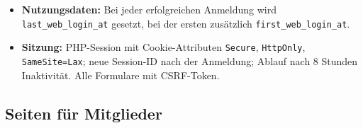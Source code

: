 \documentclass[a4paper,fontsize=10pt]{scrartcl}
\newcommand{\code}[1]{\texttt{#1}}
\begin{document}
\begin{itemize}
        Versuche, Ende der Sperre). Administratoren heben sie einzeln oder
        alle auf einmal auf (\code{POST /admin/sperren/aufheben}); die
        Detailansicht eines Mitglieds zeigt dessen Sperren mit derselben
        Aktion.
  \item \textbf{Nutzungsdaten:} Bei jeder erfolgreichen Anmeldung wird
        \code{last\_web\_login\_at} gesetzt, bei der ersten zusätzlich
        \code{first\_web\_login\_at}.
  \item \textbf{Sitzung:} PHP-Session mit Cookie-Attributen \code{Secure},
        \code{HttpOnly}, \code{SameSite=Lax}; neue Session-ID nach der
        Anmeldung; Ablauf nach 8 Stunden Inaktivität. Alle Formulare mit
        CSRF-Token.
\end{itemize}

\subsection{Seiten für Mitglieder}
\end{document}

